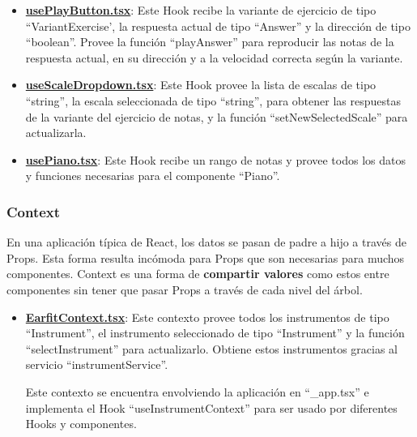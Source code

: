\documentclass[12pt,twoside,titlepage]{report}
\begin{document}
\begin{itemize}
    \item \href{https://github.com/alberttogoca/EarFit/blob/main/src/hooks/usePlayButton.tsx}{\textbf{usePlayButton.tsx}}: Este Hook recibe la variante de ejercicio de tipo ``VariantExercise', la respuesta actual de tipo ``Answer'' y la dirección de tipo ``boolean''. Provee la función ``playAnswer'' para reproducir las notas de la respuesta actual, en su dirección y a la velocidad correcta según la variante.
    \item \href{https://github.com/alberttogoca/EarFit/blob/main/src/hooks/useScaleDropdown.tsx}{\textbf{useScaleDropdown.tsx}}: Este Hook provee la lista de escalas de tipo ``string\text{[]}'', la escala seleccionada de tipo ``string'', para obtener las respuestas de la variante del ejercicio de notas, y la función ``setNewSelectedScale'' para actualizarla.
    \item \href{https://github.com/alberttogoca/EarFit/blob/main/src/hooks/usePiano.tsx}{\textbf{usePiano.tsx}}: Este Hook recibe un rango de notas y provee todos los datos y funciones necesarias para el componente ``Piano''.
\end{itemize}

\subsubsection{Context}

En una aplicación típica de React, los datos se pasan de padre a hijo a través de Props. Esta forma resulta incómoda para Props que son necesarias para muchos componentes. Context es una forma de \textbf{compartir valores} como estos entre componentes sin tener que pasar Props a través de cada nivel del árbol.
\cite{context1}

\begin{itemize}
    \item \href{https://github.com/alberttogoca/EarFit/blob/main/src/context/EarfitContext.tsx}{\textbf{EarfitContext.tsx}}: Este contexto provee todos los instrumentos de tipo ``Instrument\text{[]}'', el instrumento seleccionado de tipo ``Instrument'' y la función ``selectInstrument'' para actualizarlo. Obtiene estos instrumentos gracias al servicio ``instrumentService''.    
    
    Este contexto se encuentra envolviendo la aplicación en ``\_app.tsx'' e implementa el Hook ``useInstrumentContext'' para ser usado por diferentes Hooks y componentes.
\end{itemize}
\end{document}
